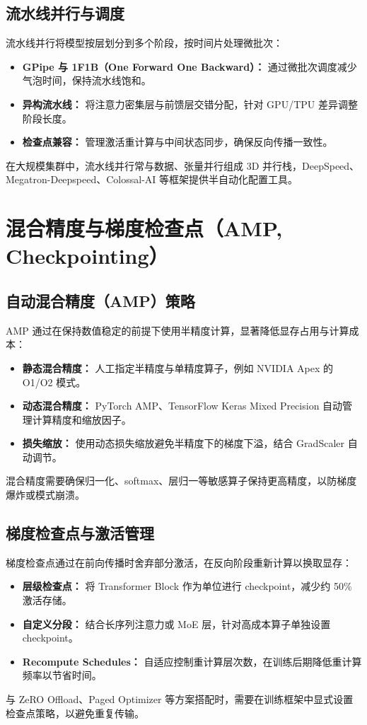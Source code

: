 \documentclass[UTF8,zihao=-4]{ctexart}
\begin{document}
\subsection{流水线并行与调度}
流水线并行将模型按层划分到多个阶段，按时间片处理微批次：
\begin{itemize}
  \item \textbf{GPipe 与 1F1B（One Forward One Backward）：} 通过微批次调度减少气泡时间，保持流水线饱和。
  \item \textbf{异构流水线：} 将注意力密集层与前馈层交错分配，针对 GPU/TPU 差异调整阶段长度。
  \item \textbf{检查点兼容：} 管理激活重计算与中间状态同步，确保反向传播一致性。
\end{itemize}
在大规模集群中，流水线并行常与数据、张量并行组成 3D 并行栈，DeepSpeed、Megatron-Deepspeed、Colossal-AI 等框架提供半自动化配置工具。

\section{混合精度与梯度检查点（AMP, Checkpointing）}
\subsection{自动混合精度（AMP）策略}
AMP 通过在保持数值稳定的前提下使用半精度计算，显著降低显存占用与计算成本：
\begin{itemize}
  \item \textbf{静态混合精度：} 人工指定半精度与单精度算子，例如 NVIDIA Apex 的 O1/O2 模式。
  \item \textbf{动态混合精度：} PyTorch AMP、TensorFlow Keras Mixed Precision 自动管理计算精度和缩放因子。
  \item \textbf{损失缩放：} 使用动态损失缩放避免半精度下的梯度下溢，结合 GradScaler 自动调节。
\end{itemize}
混合精度需要确保归一化、softmax、层归一等敏感算子保持更高精度，以防梯度爆炸或模式崩溃。

\subsection{梯度检查点与激活管理}
梯度检查点通过在前向传播时舍弃部分激活，在反向阶段重新计算以换取显存：
\begin{itemize}
  \item \textbf{层级检查点：} 将 Transformer Block 作为单位进行 checkpoint，减少约 50\% 激活存储。
  \item \textbf{自定义分段：} 结合长序列注意力或 MoE 层，针对高成本算子单独设置 checkpoint。
  \item \textbf{Recompute Schedules：} 自适应控制重计算层次数，在训练后期降低重计算频率以节省时间。
\end{itemize}
与 ZeRO Offload、Paged Optimizer 等方案搭配时，需要在训练框架中显式设置检查点策略，以避免重复传输。
\end{document}
